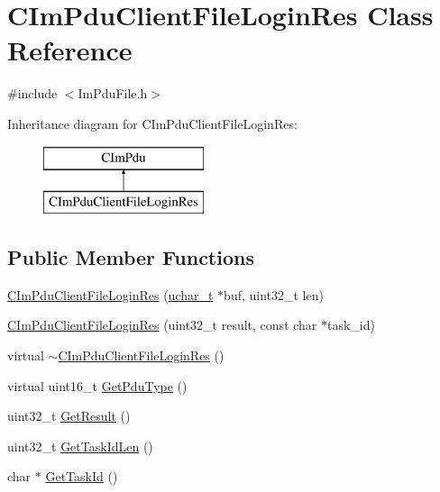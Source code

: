 \hypertarget{class_c_im_pdu_client_file_login_res}{}\section{C\+Im\+Pdu\+Client\+File\+Login\+Res Class Reference}
\label{class_c_im_pdu_client_file_login_res}


{\ttfamily \#include $<$Im\+Pdu\+File.\+h$>$}

Inheritance diagram for C\+Im\+Pdu\+Client\+File\+Login\+Res\+:\begin{figure}[H]
\begin{center}
\leavevmode
\includegraphics[height=2.000000cm]{class_c_im_pdu_client_file_login_res}
\end{center}
\end{figure}
\subsection*{Public Member Functions}
\begin{DoxyCompactItemize}
\item 
\hyperlink{class_c_im_pdu_client_file_login_res_af8887771e74aa127d759a2db5ee44965}{C\+Im\+Pdu\+Client\+File\+Login\+Res} (\hyperlink{base_2ostype_8h_a124ea0f8f4a23a0a286b5582137f0b8d}{uchar\+\_\+t} $\ast$buf, uint32\+\_\+t len)
\item 
\hyperlink{class_c_im_pdu_client_file_login_res_aee4b327ef640d5ada48116dd305c886b}{C\+Im\+Pdu\+Client\+File\+Login\+Res} (uint32\+\_\+t result, const char $\ast$task\+\_\+id)
\item 
virtual \hyperlink{class_c_im_pdu_client_file_login_res_a891c121ecdf1d14fe888afc4c39acb01}{$\sim$\+C\+Im\+Pdu\+Client\+File\+Login\+Res} ()
\item 
virtual uint16\+\_\+t \hyperlink{class_c_im_pdu_client_file_login_res_a670537fdac31aef50c6a368c40c604ee}{Get\+Pdu\+Type} ()
\item 
uint32\+\_\+t \hyperlink{class_c_im_pdu_client_file_login_res_aa573186efb1c624874330bd38686e1d3}{Get\+Result} ()
\item 
uint32\+\_\+t \hyperlink{class_c_im_pdu_client_file_login_res_a5320a48e2a6ddf514534e64f38b925cc}{Get\+Task\+Id\+Len} ()
\item 
char $\ast$ \hyperlink{class_c_im_pdu_client_file_login_res_a747f2382d90a63c78f37ddf179eaa3a1}{Get\+Task\+Id} ()
\end{DoxyCompactItemize}
